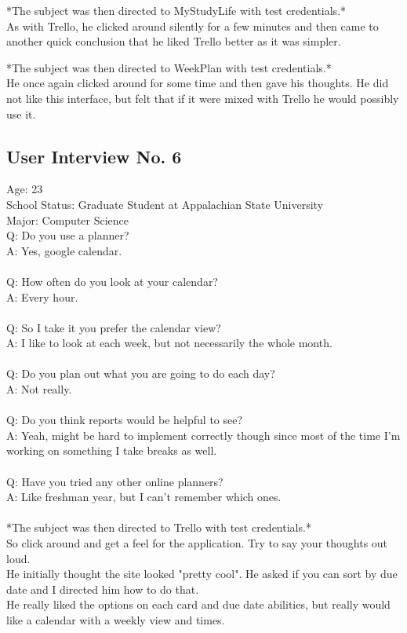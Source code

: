 *The subject was then directed to MyStudyLife with test credentials.*\\
As with Trello, he clicked around silently for a few minutes and then came to another quick conclusion that he liked Trello better as it was simpler.

*The subject was then directed to WeekPlan with test credentials.*\\
He once again clicked around for some time and then gave his thoughts. He did not like this interface, but felt that if it were mixed with Trello he would possibly use it.

\subsection{User Interview No. 6}
Age: 23\\
School Status: Graduate Student at Appalachian State University\\
Major: Computer Science
\\
Q: Do you use a planner?\\
A: Yes, google calendar. \\ \\
Q: How often do you look at your calendar?\\
A: Every hour.\\ \\
Q: So I take it you prefer the calendar view?\\
A: I like to look at each week, but not necessarily the whole month.\\ \\
Q: Do you plan out what you are going to do each day?\\
A: Not really.\\ \\
Q: Do you think reports would be helpful to see?\\
A: Yeah, might be hard to implement correctly though since most of the time I'm working on something I take breaks as well.\\ \\
Q: Have you tried any other online planners?\\
A: Like freshman year, but I can't remember which ones.\\ \\

*The subject was then directed to Trello with test credentials.*\\
So click around and get a feel for the application. Try to say your thoughts out loud.\\
He initially thought the site looked "pretty cool". He asked if you can sort by due date and I directed him how to do that.\\
He really liked the options on each card and due date abilities, but really would like a calendar with a weekly view and times.

